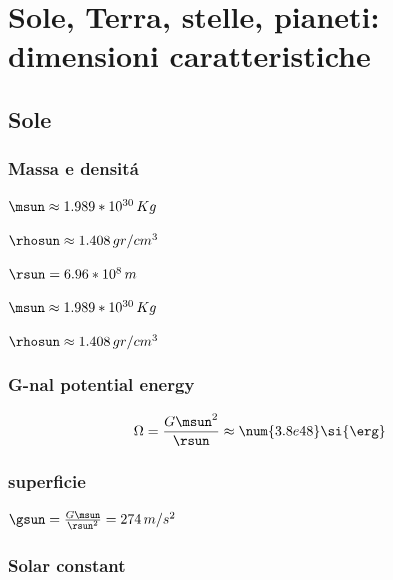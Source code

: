 \chapter{Sole, Terra, stelle, pianeti: dimensioni caratteristiche}
\PartialToc

\section{Sole}

\subsection{Massa e densit\'a}
\begin{itemize*}
\item $\msun\approx1.989*10^{30}\,Kg$
\item $\rhosun\approx1.408 \, gr/cm^3$
\end{itemize*}

\begin{itemize*}
\item $\rsun=6.96*10^8\,m$
\end{itemize*}
\begin{itemize*}
\item $\msun\approx1.989*10^{30}\,Kg$
\item $\rhosun\approx1.408 \, gr/cm^3$
\end{itemize*}

\subsection{G-nal potential energy}

\begin{equation*}
\Omega=\frac{G\msun^2}{\rsun}\approx\num{3.8e48}\si{\erg}
\end{equation*}

\subsection{superficie}

\begin{itemize*}
\item $\gsun=\frac{G\msun}{\rsun^2}=274\,m/s^2$
\end{itemize*}

\subsection{Solar constant}

